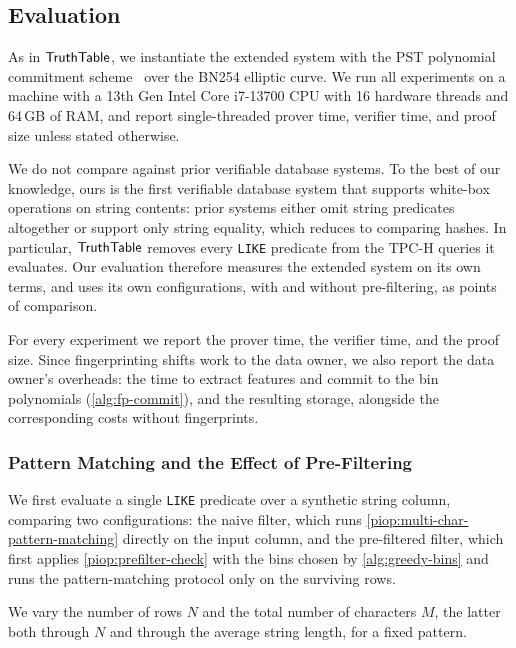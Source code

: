 \subsection{Evaluation}
\label{sec:evaluation}

 As in $\mathsf{TruthTable}$, we instantiate the extended system with the PST polynomial commitment scheme~\cite{PapamanthouST13} over the BN254 elliptic curve. We run all experiments on a machine with a 13th Gen Intel Core i7-13700 CPU with 16 hardware threads and 64\,GB of RAM, and report single-threaded prover time, verifier time, and proof size unless stated otherwise.

 We do not compare against prior verifiable database systems. To the best of our knowledge, ours is the first verifiable database system that supports white-box operations on string contents: prior systems either omit string predicates altogether or support only string equality, which reduces to comparing hashes. In particular, $\mathsf{TruthTable}$ removes every \texttt{LIKE} predicate from the TPC-H queries it evaluates. Our evaluation therefore measures the extended system on its own terms, and uses its own configurations, with and without pre-filtering, as points of comparison.

 For every experiment we report the prover time, the verifier time, and the proof size. Since fingerprinting shifts work to the data owner, we also report the data owner's overheads: the time to extract features and commit to the bin polynomials (\cref{alg:fp-commit}), and the resulting storage, alongside the corresponding costs without fingerprints.

\subsubsection{Pattern Matching and the Effect of Pre-Filtering}
\label{sec:eval-prefilter}

We first evaluate a single \texttt{LIKE} predicate over a synthetic string column, comparing two configurations: the naive filter, which runs \cref{piop:multi-char-pattern-matching} directly on the input column, and the pre-filtered filter, which first applies \cref{piop:prefilter-check} with the bins chosen by \cref{alg:greedy-bins} and runs the pattern-matching protocol only on the surviving rows.

 We vary the number of rows $N$ and the total number of characters $M$, the latter both through $N$ and through the average string length, for a fixed pattern.

